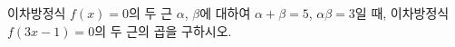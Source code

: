 이차방정식 $f(x)=0$의 두 근 $\alpha$, $\beta$에 대하여 $\alpha+\beta=5$, $\alpha\beta=3$일 때, 이차방정식 $f(3x-1)=0$의 두 근의 곱을 구하시오.
